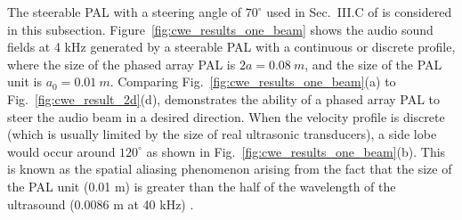 The steerable PAL with a steering angle of $70^\circ$ used in Sec.~III.C of \cite{Shi2015ConvolutionModelComputing} is considered in this subsection. 
Figure~\ref{fig:cwe_results_one_beam} shows the audio sound fields at 4 kHz generated by a steerable PAL with a continuous or discrete profile, where the size of the phased array PAL is $2a = \SI{0.08}{m}$, and the size of the PAL unit is $a_0 = \SI{0.01}{m}$. 
Comparing Fig.~\ref{fig:cwe_results_one_beam}(a) to Fig.~\ref{fig:cwe_result_2d}(d), demonstrates the ability of a phased array PAL to steer the audio beam in a desired direction. When the velocity profile is discrete (which is usually limited by the size of real ultrasonic transducers), a side lobe would occur around $120^\circ$ as shown in Fig.~\ref{fig:cwe_results_one_beam}(b). 
This is known as the spatial aliasing phenomenon arising from the fact that the size of the PAL unit (0.01 m) is greater than the half of the wavelength of the ultrasound (0.0086 m at 40 kHz) \cite{Shi2011GratingLobeElimination}.

